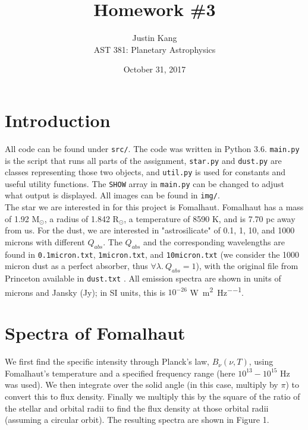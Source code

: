 \documentclass[12pt]{article}
\title{\vspace{-2.5em} \Large \textbf{Homework \#3}}
\author{Justin Kang \\ AST 381: Planetary Astrophysics}
\date{\vspace{-0.75em} October 31, 2017}
\begin{document}
\maketitle

\section*{Introduction}
All code can be found under \texttt{src/}. The code was written in Python 3.6. \texttt{main.py} is the script that runs all parts of the assignment, \texttt{star.py} and \texttt{dust.py} are classes representing those two objects, and \texttt{util.py} is used for constants and useful utility functions. The \texttt{SHOW} array in \texttt{main.py} can be changed to adjust what output is displayed. All images can be found in \texttt{img/}.\\
\indent The star we are interested in for this project is Fomalhaut. Fomalhaut has a mass of 1.92 M$_{\odot}$, a radius of 1.842 R$_{\odot}$, a temperature of 8590 K, and is 7.70 pc away from us. For the dust, we are interested in "astrosilicate" of 0.1, 1, 10, and 1000 microns with different $Q_{abs}$. The $Q_{abs}$ and the corresponding wavelengths are found in \texttt{0.1micron.txt}, \texttt{1micron.txt}, and \texttt{10micron.txt} (we consider the 1000 micron dust as a perfect absorber, thus $\forall\lambda.\ Q_{abs} = 1$), with the original file from Princeton available in \texttt{dust.txt} \cite{dust}. All emission spectra are shown in units of microns and Jansky (Jy); in SI units, this is $10^{-26}$ \si{\watt\per\square\meter\per\hertz}.


\section{Spectra of Fomalhaut}

We first find the specific intensity through Planck's law, $B_{\nu}(\nu,T)$, using Fomalhaut's temperature and a specified frequency range (here $10^{13}-10^{15}$ Hz was used). We then integrate over the solid angle (in this case, multiply by $\pi$) to convert this to flux density. Finally we multiply this by the square of the ratio of the stellar and orbital radii to find the flux density at those orbital radii (assuming a circular orbit). The resulting spectra are shown in Figure 1.
\end{document}
